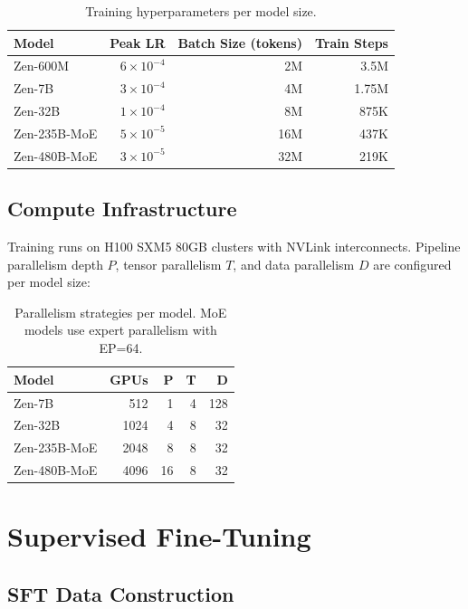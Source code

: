 \documentclass[11pt,a4paper]{article}
\begin{document}
\begin{table}[H]
\centering
\begin{tabular}{lrrr}
\toprule
\textbf{Model} & \textbf{Peak LR} & \textbf{Batch Size (tokens)} & \textbf{Train Steps} \\
\midrule
Zen-600M & $6\times10^{-4}$ & 2M & 3.5M \\
Zen-7B & $3\times10^{-4}$ & 4M & 1.75M \\
Zen-32B & $1\times10^{-4}$ & 8M & 875K \\
Zen-235B-MoE & $5\times10^{-5}$ & 16M & 437K \\
Zen-480B-MoE & $3\times10^{-5}$ & 32M & 219K \\
\bottomrule
\end{tabular}
\caption{Training hyperparameters per model size.}
\end{table}

\subsection{Compute Infrastructure}

Training runs on H100 SXM5 80GB clusters with NVLink interconnects. Pipeline
parallelism depth $P$, tensor parallelism $T$, and data parallelism $D$ are
configured per model size:

\begin{table}[H]
\centering
\begin{tabular}{lrrrr}
\toprule
\textbf{Model} & \textbf{GPUs} & \textbf{P} & \textbf{T} & \textbf{D} \\
\midrule
Zen-7B & 512 & 1 & 4 & 128 \\
Zen-32B & 1024 & 4 & 8 & 32 \\
Zen-235B-MoE & 2048 & 8 & 8 & 32 \\
Zen-480B-MoE & 4096 & 16 & 8 & 32 \\
\bottomrule
\end{tabular}
\caption{Parallelism strategies per model. MoE models use expert parallelism with EP=64.}
\end{table}

\section{Supervised Fine-Tuning}

\subsection{SFT Data Construction}
\end{document}
